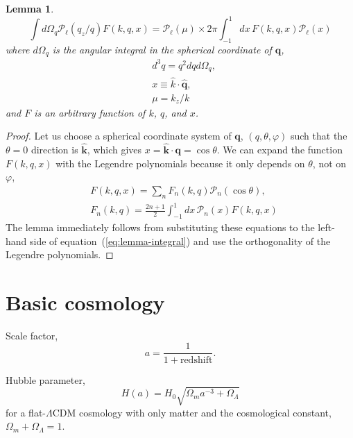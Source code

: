 \documentclass[a4paper,11pt, fleqn]{article}
\newtheorem{lemma}{Lemma}
\begin{document}
\begin{lemma}
  \label{lemma-integral}
  \begin{equation}
    \label{eq:lemma-integral}
    \int \! d\Omega_q \mathcal{P}_\ell(q_z/q) F(k, q, x)
    = \mathcal{P}_\ell(\mu)
      \times 2\pi \int_{-1}^1 \! dx \, F(k, q, x) \mathcal{P}_\ell(x)
  \end{equation}
  where $d\Omega_q$ is the angular integral in the spherical coordinate
  of $\bm{q}$,
  \begin{align}
    &d^3 q = q^2 dq d\Omega_q,\\
    &x \equiv \hat{k}\cdot\hat{\bm{q}},\\
    &\mu = k_z/k
  \end{align}
  and $F$ is an arbitrary
  function of $k$, $q$, and $x$.
\end{lemma}

\begin{proof}
Let us choose a spherical coordinate system of $\bm{q}$, $(q, \theta,
\varphi)$ such that the $\theta = 0$ direction is $\hat{\bm{k}}$,
which gives $x = \hat{\bm{k}}\cdot\bm{\bm{q}} = \cos\theta$. We can expand
the function $F(k, q, x)$ with the Legendre polynomials because it
only depends on $\theta$, not on $\varphi$,
\begin{align}
  &F(k, q, x) = \sum_n F_{n}(k, q) \mathcal{P}_n(\cos\theta),\\
  &F_{n}(k, q) = \frac{2n + 1}{2} \int_{-1}^1 \! dx \,\mathcal{P}_n(x) F(k, q, x)
\end{align}
The lemma immediately follows from substituting these equations to the
left-hand side of equation~(\ref{eq:lemma-integral}) and use the
orthogonality of the Legendre polynomials.
\end{proof}


\clearpage
\section{Basic cosmology}

Scale factor,
\begin{equation}
  a = \frac{1}{1 + \mathrm{redshift}}.
\end{equation}

Hubble parameter,
\begin{equation}
  H(a) = H_0 \sqrt{\Omega_m a^{-3} + \Omega_\Lambda}
\end{equation}
for a flat-$\Lambda$CDM cosmology with only matter and the
cosmological constant, $\Omega_m + \Omega_\Lambda = 1$.\\
\end{document}
